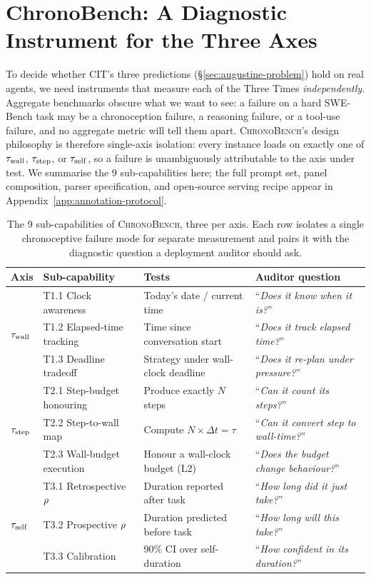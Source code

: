 
\section{ChronoBench: A Diagnostic Instrument for the Three Axes}
\label{sec:chronobench}

To decide whether CIT's three predictions (\S\ref{sec:augustine-problem}) hold on real agents, we need instruments that measure each of the Three Times \emph{independently}. Aggregate benchmarks obscure what we want to see: a failure on a hard SWE-Bench task may be a chronoception failure, a reasoning failure, or a tool-use failure, and no aggregate metric will tell them apart. \textsc{ChronoBench}'s design philosophy is therefore single-axis isolation: every instance loads on exactly one of $\tau_{\mathrm{wall}}$, $\tau_{\mathrm{step}}$, or $\tau_{\mathrm{self}}$, so a failure is unambiguously attributable to the axis under test. We summarise the 9 sub-capabilities here; the full prompt set, panel composition, parser specification, and open-source serving recipe appear in Appendix~\ref{app:annotation-protocol}.

\begin{table}[h]
\centering
\caption{The 9 sub-capabilities of \textsc{ChronoBench}, three per axis. Each row isolates a single chronoceptive failure mode for separate measurement and pairs it with the diagnostic question a deployment auditor should ask.}
\label{tab:capabilities}
\small
\begin{tabular}{@{}llp{4.6cm}p{4.2cm}@{}}
\toprule
Axis & Sub-capability & Tests & Auditor question \\
\midrule
\multirow{3}{*}{$\tau_{\mathrm{wall}}$}
 & T1.1 Clock awareness       & Today's date / current time      & ``\emph{Does it know when it is?}'' \\
 & T1.2 Elapsed-time tracking & Time since conversation start    & ``\emph{Does it track elapsed time?}'' \\
 & T1.3 Deadline tradeoff     & Strategy under wall-clock deadline & ``\emph{Does it re-plan under pressure?}'' \\
\midrule
\multirow{3}{*}{$\tau_{\mathrm{step}}$}
 & T2.1 Step-budget honouring & Produce exactly $N$ steps        & ``\emph{Can it count its steps?}'' \\
 & T2.2 Step-to-wall map      & Compute $N\!\times\!\Delta t = \tau$ & ``\emph{Can it convert step to wall-time?}'' \\
 & T2.3 Wall-budget execution & Honour a wall-clock budget (L2)  & ``\emph{Does the budget change behaviour?}'' \\
\midrule
\multirow{3}{*}{$\tau_{\mathrm{self}}$}
 & T3.1 Retrospective $\rho$ & Duration reported after task   & ``\emph{How long did it just take?}'' \\
 & T3.2 Prospective $\rho$   & Duration predicted before task & ``\emph{How long will this take?}'' \\
 & T3.3 Calibration             & 90\% CI over self-duration     & ``\emph{How confident in its duration?}'' \\
\bottomrule
\end{tabular}
\end{table}

